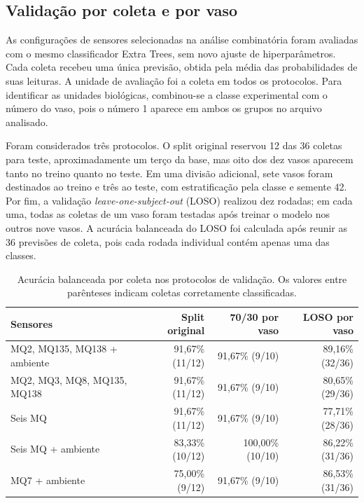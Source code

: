 \subsection{Validação por coleta e por vaso}

As configurações de sensores selecionadas na análise combinatória foram
avaliadas com o mesmo classificador Extra Trees, sem novo ajuste de
hiperparâmetros. Cada coleta recebeu uma única previsão, obtida pela média
das probabilidades de suas leituras. A unidade de avaliação foi a coleta em
todos os protocolos. Para identificar as unidades biológicas, combinou-se
a classe experimental com o número do vaso, pois o número 1 aparece em ambos
os grupos no arquivo analisado.

Foram considerados três protocolos. O split original reservou 12 das 36
coletas para teste, aproximadamente um terço da base, mas oito dos dez vasos
aparecem tanto no treino quanto no teste. Em uma divisão adicional, sete vasos
foram destinados ao treino e três ao teste, com estratificação pela classe e
semente 42. Por fim, a validação \textit{leave-one-subject-out} (LOSO) realizou
dez rodadas; em cada uma, todas as coletas de um vaso foram testadas após
treinar o modelo nos outros nove vasos. A acurácia balanceada do LOSO foi
calculada após reunir as 36 previsões de coleta, pois cada rodada individual
contém apenas uma das classes.

\begin{table}[htbp]
\centering
\caption{Acurácia balanceada por coleta nos protocolos de validação. Os
valores entre parênteses indicam coletas corretamente classificadas.}
\label{tab:validacao_vaso_loso}
\begin{tabular}{lrrr}
\hline
Sensores & Split original & 70/30 por vaso & LOSO por vaso \\
\hline
MQ2, MQ135, MQ138 + ambiente & 91,67\% (11/12) & 91,67\% (9/10) & 89,16\% (32/36) \\
MQ2, MQ3, MQ8, MQ135, MQ138 & 91,67\% (11/12) & 91,67\% (9/10) & 80,65\% (29/36) \\
Seis MQ & 91,67\% (11/12) & 91,67\% (9/10) & 77,71\% (28/36) \\
Seis MQ + ambiente & 83,33\% (10/12) & 100,00\% (10/10) & 86,22\% (31/36) \\
MQ7 + ambiente & 75,00\% (9/12) & 91,67\% (9/10) & 86,53\% (31/36) \\
\hline
\end{tabular}
\end{table}

